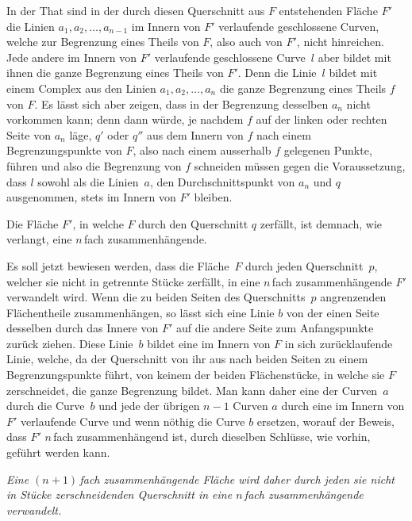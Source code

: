 \documentclass[a4paper,12pt,leqno]{article}
\begin{document}
In der That sind in der durch diesen Querschnitt aus $F$
entstehenden Fl\"{a}che $F'$ die Linien
$a_1, a_2,\ldots, a_{n-1}$ im Innern von $F'$ verlaufende
geschlossene Curven, welche zur Begrenzung eines Theils von $F$,
also auch von $F'$, nicht hinreichen.  Jede andere im Innern von
$F'$ verlaufende geschlossene Curve~$l$ aber bildet mit ihnen die
ganze Begrenzung eines Theils von $F'$.  Denn die Linie~$l$
bildet mit einem Complex aus den Linien
$a_1, a_2,\ldots, a_n$ die ganze Begrenzung eines Theils $f$
von $F$.  Es l\"{a}sst sich aber zeigen, dass in der Begrenzung
desselben $a_n$ nicht vorkommen kann; denn dann w\"{u}rde, je
nachdem $f$ auf der linken oder rechten Seite von $a_n$ l\"{a}ge,
$q'$ oder $q''$ aus dem Innern von $f$ nach einem
Begrenzungspunkte von $F$, also nach einem ausserhalb $f$
gelegenen Punkte, f\"{u}hren und also die Begrenzung von $f$
schneiden m\"{u}ssen gegen die Voraussetzung, dass $l$ sowohl als
die Linien~$a$, den Durchschnittspunkt von $a_n$ und $q$
ausgenommen, stets im Innern von $F'$ bleiben.

Die Fl\"{a}che $F'$, in welche $F$ durch den Querschnitt $q$
zerf\"{a}llt, ist demnach, wie verlangt, eine $n \,$\-fach
zusammenh\"{a}ngende.

Es soll jetzt bewiesen werden, dass die Fl\"{a}che~$F$ durch
jeden Querschnitt~$p$, welcher sie nicht in getrennte St\"{u}cke
zerf\"{a}llt, in eine $n \,$\-fach zusammenh\"{a}ngende $F'$
verwandelt wird.  Wenn die zu beiden Seiten des Querschnitts~$p$
angrenzenden Fl\"{a}chentheile zusammenh\"{a}ngen, so l\"{a}sst
sich eine Linie $b$ von der einen Seite desselben durch das Innere
von $F'$ auf die andere Seite zum Anfangspunkte zur\"{u}ck
ziehen.  Diese Linie~$b$ bildet eine im Innern von $F$ in sich
zur\"{u}cklaufende Linie, welche, da der Querschnitt von ihr aus
nach beiden Seiten zu einem Begrenzungspunkte f\"{u}hrt, von
keinem der beiden Fl\"{a}chenst\"{u}cke, in welche sie $F$
zerschneidet, die ganze Begrenzung bildet.  Man kann daher eine
der Curven~$a$ durch die Curve~$b$ und jede der \"{u}brigen
$n - 1$ Curven $a$ durch eine im Innern von $F'$ verlaufende
Curve und wenn n\"{o}thig die Curve $b$ ersetzen, worauf der
Beweis, dass $F'$ $n \,$\-fach zusammenh\"{a}ngend ist, durch
dieselben Schl\"{u}sse, wie vorhin, gef\"{u}hrt werden kann.

{\itshape
Eine ${(n + 1)} \,$\-fach zusammenh\"{a}ngende Fl\"{a}che wird
daher durch jeden sie nicht in St\"{u}cke zerschneidenden
Querschnitt in eine $n \,$\-fach zusammenh\"{a}ngende verwandelt.}
\end{document}
